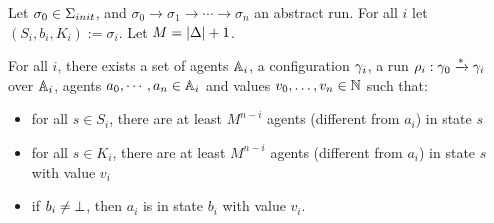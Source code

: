 %	
%	
%	
%	
%	
%	



\begin{lemma}
	\label{lem:correctness-construction}
	

	Let $\sigma_0 \in \aconfiginitset$, and $\sigma_0 \to \sigma_1 \to \cdots \to \sigma_n$ an abstract run. For all $i$ let $(S_i, b_i, K_i) := \sigma_i$. Let $M = |\Delta|+1$.
	
	For all $i$, there exists a set of agents $\mathbb{A}_i$, a configuration $\gamma_i$, a run $\rho_i : \gamma_0 \xrightarrow{*} \gamma_i$ over $\mathbb{A}_i$, agents $a_0, \cdots, a_n \in \mathbb{A}_i$ and values $v_0, \ldots, v_n \in \mathbb{N}$ such that:
	\begin{itemize}
		\item for all $s \in S_i$, there are at least $M^{n-i}$ agents (different from $a_i$) in state $s$ 
		
		\item for all $s \in K_i$, there are at least $M^{n-i}$ agents (different from $a_i$) in state $s$ with value $v_i$
		
		\item if $b_i \neq \bot$, then $a_i$ is in state $b_i$ with value $v_i$.
	\end{itemize}
\end{lemma}

